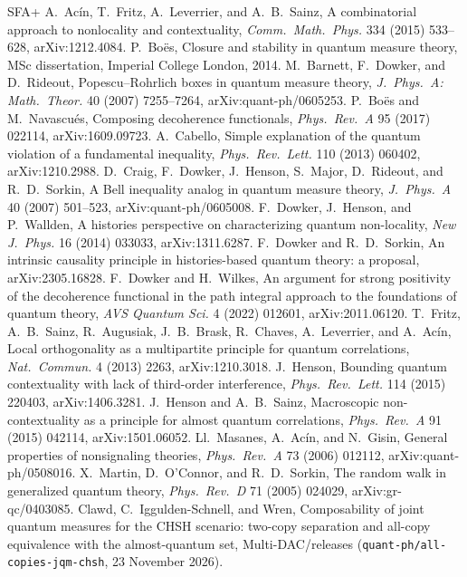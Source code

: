 \documentclass[11pt,a4paper]{article}
\theoremstyle{definition}
\theoremstyle{remark}
\begin{document}
\begin{thebibliography}{SFA+}
 A.~Ac\'in, T.~Fritz, A.~Leverrier, and A.~B.~Sainz, A combinatorial approach to nonlocality and contextuality, \emph{Comm.\ Math.\ Phys.} 334 (2015) 533--628, arXiv:1212.4084.
 P.~Bo\"es, Closure and stability in quantum measure theory, MSc dissertation, Imperial College London, 2014.
 M.~Barnett, F.~Dowker, and D.~Rideout, Popescu--Rohrlich boxes in quantum measure theory, \emph{J.\ Phys.\ A: Math.\ Theor.} 40 (2007) 7255--7264, arXiv:quant-ph/0605253.
 P.~Bo\"es and M.~Navascu\'es, Composing decoherence functionals, \emph{Phys.\ Rev.\ A} 95 (2017) 022114, arXiv:1609.09723.
 A.~Cabello, Simple explanation of the quantum violation of a fundamental inequality, \emph{Phys.\ Rev.\ Lett.} 110 (2013) 060402, arXiv:1210.2988.
 D.~Craig, F.~Dowker, J.~Henson, S.~Major, D.~Rideout, and R.~D.~Sorkin, A Bell inequality analog in quantum measure theory, \emph{J.\ Phys.\ A} 40 (2007) 501--523, arXiv:quant-ph/0605008.
 F.~Dowker, J.~Henson, and P.~Wallden, A histories perspective on characterizing quantum non-locality, \emph{New J.\ Phys.} 16 (2014) 033033, arXiv:1311.6287.
 F.~Dowker and R.~D.~Sorkin, An intrinsic causality principle in histories-based quantum theory: a proposal, arXiv:2305.16828.
 F.~Dowker and H.~Wilkes, An argument for strong positivity of the decoherence functional in the path integral approach to the foundations of quantum theory, \emph{AVS Quantum Sci.} 4 (2022) 012601, arXiv:2011.06120.
 T.~Fritz, A.~B.~Sainz, R.~Augusiak, J.~B.~Brask, R.~Chaves, A.~Leverrier, and A.~Ac\'in, Local orthogonality as a multipartite principle for quantum correlations, \emph{Nat.\ Commun.} 4 (2013) 2263, arXiv:1210.3018.
 J.~Henson, Bounding quantum contextuality with lack of third-order interference, \emph{Phys.\ Rev.\ Lett.} 114 (2015) 220403, arXiv:1406.3281.
 J.~Henson and A.~B.~Sainz, Macroscopic non-contextuality as a principle for almost quantum correlations, \emph{Phys.\ Rev.\ A} 91 (2015) 042114, arXiv:1501.06052.
 Ll.~Masanes, A.~Ac\'in, and N.~Gisin, General properties of nonsignaling theories, \emph{Phys.\ Rev.\ A} 73 (2006) 012112, arXiv:quant-ph/0508016.
 X.~Martin, D.~O'Connor, and R.~D.~Sorkin, The random walk in generalized quantum theory, \emph{Phys.\ Rev.\ D} 71 (2005) 024029, arXiv:gr-qc/0403085.
 Clawd, C.~Iggulden-Schnell, and Wren, Composability of joint quantum measures for the CHSH scenario: two-copy separation and all-copy equivalence with the almost-quantum set, Multi-DAC/releases (\texttt{quant-ph/all-copies-jqm-chsh}, 23 November 2026).

\end{thebibliography}
\end{document}
